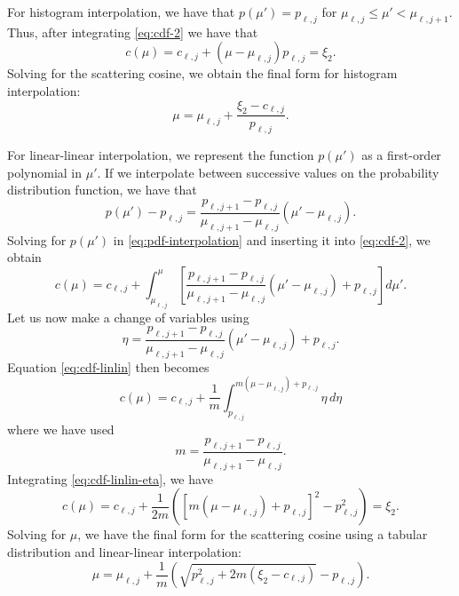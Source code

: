For histogram interpolation, we have that $p(\mu') = p_{\ell,j}$ for
$\mu_{\ell,j} \le \mu' < \mu_{\ell,j+1}$. Thus, after integrating
\eqref{eq:cdf-2} we have that
\begin{equation}
  \label{eq:cumulative-dist-histogram}
  c(\mu) = c_{\ell,j} + (\mu - \mu_{\ell,j}) p_{\ell,j} = \xi_2.
\end{equation}
Solving for the scattering cosine, we obtain the final form for histogram
interpolation:
\begin{equation}
  \label{eq:cosine-histogram}
  \mu = \mu_{\ell,j} + \frac{\xi_2 - c_{\ell,j}}{p_{\ell,j}}.
\end{equation}

For linear-linear interpolation, we represent the function $p(\mu')$ as a
first-order polynomial in $\mu'$. If we interpolate between successive values on
the probability distribution function, we have that
\begin{equation}
  \label{eq:pdf-interpolation}
    p(\mu') - p_{\ell,j} = \frac{p_{\ell,j+1} - p_{\ell,j}}{\mu_{\ell,j+1} -
    \mu_{\ell,j}} (\mu' - \mu_{\ell,j}).
\end{equation}
Solving for $p(\mu')$ in \eqref{eq:pdf-interpolation} and inserting it into
\eqref{eq:cdf-2}, we obtain
\begin{equation}
  \label{eq:cdf-linlin}
    c(\mu) = c_{\ell,j} + \int_{\mu_{\ell,j}}^{\mu} \left [ \frac{p_{\ell,j+1} -
    p_{\ell,j}}{\mu_{\ell,j+1} - \mu_{\ell,j}} (\mu' - \mu_{\ell,j}) +
    p_{\ell,j} \right ] d\mu'.
\end{equation}
Let us now make a change of variables using
\begin{equation}
  \label{eq:introduce-eta}
    \eta = \frac{p_{\ell,j+1} - p_{\ell,j}}{\mu_{\ell,j+1} - \mu_{\ell,j}}
    (\mu' - \mu_{\ell,j}) + p_{\ell,j}.
\end{equation}
Equation \eqref{eq:cdf-linlin} then becomes
\begin{equation}
  \label{eq:cdf-linlin-eta}
    c(\mu) = c_{\ell,j} + \frac{1}{m} \int_{p_{\ell,j}}^{m(\mu - \mu_{\ell,j}) +
    p_{\ell,j}} \eta \, d\eta
\end{equation}
where we have used
\begin{equation}
  \label{eq:slope}
    m = \frac{p_{\ell,j+1} - p_{\ell,j}}{\mu_{\ell,j+1} - \mu_{\ell,j}}.
\end{equation}
Integrating \eqref{eq:cdf-linlin-eta}, we have
\begin{equation}
  \label{eq:cdf-linlin-integrated}
    c(\mu) = c_{\ell,j} + \frac{1}{2m} \left ( \left [ m (\mu - \mu_{\ell,j} ) +
    p_{\ell,j} \right ]^2 - p_{\ell,j}^2 \right ) = \xi_2.
\end{equation}
Solving for $\mu$, we have the final form for the scattering cosine using a
tabular distribution and linear-linear interpolation:
\begin{equation}
  \label{eq:cosine-linlin}
    \mu = \mu_{\ell,j} + \frac{1}{m} \left ( \sqrt{p_{\ell,j}^2 + 2 m (\xi_2 -
    c_{\ell,j} )} - p_{\ell,j} \right ).
\end{equation}

